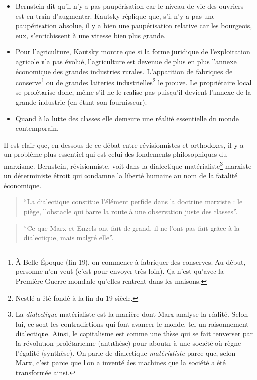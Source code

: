 \documentclass[12pt]{report}
\begin{document}
\begin{itemize}
	\item Bernstein dit qu'il n'y a pas paupérisation car le niveau de vie des ouvriers est en train d'augmenter. Kautsky réplique que, s'il n'y a pas une paupérisation absolue, il y a bien une paupérisation relative car les bourgeois, eux, s'enrichissent à une vitesse bien plus grande.
	\item Pour l’agriculture, Kautsky montre que si la forme juridique de l’exploitation agricole n’a pas évolué, l’agriculture est devenue de plus en plus l’annexe économique des grandes industries rurales. L’apparition de fabriques de conserve\footnote{À Belle Époque (fin 19), on commence à fabriquer des conserves. Au début, personne n'en veut (c'est pour envoyer très loin). Ça n'est qu'avec la Première Guerre mondiale qu'elles rentrent dans les maisons.} ou de grandes laiteries industrielles\footnote{Nestlé a été fondé à la fin du 19 siècle.} le prouve. Le propriétaire local se prolétarise donc, même s’il ne le réalise pas puisqu’il devient l’annexe de la grande industrie (en étant son fournisseur).
	\item Quand à la lutte des classes elle demeure une réalité essentielle du monde contemporain.
\end{itemize}

Il est clair que, en dessous de ce débat entre révisionnistes et orthodoxes, il y a un problème plus essentiel qui est celui des fondements philosophiques du marxisme.
Bernstein, révisionniste, voit dans la dialectique matérialiste\footnote{La \emph{dialectique} matérialiste est la manière dont Marx analyse la réalité. Selon lui, ce sont les contradictions qui font avancer le monde, tel un raisonnement dialectique. Ainsi, le capitalisme est comme une thèse qui se fait renverser par la révolution prolétarienne (antithèse) pour aboutir à une société où règne l'égalité (synthèse). On parle de dialectique \emph{matérialiste} parce que, selon Marx, c'est parce que l'on a inventé des machines que la société a été transformée ainsi.} marxiste un déterministe étroit qui condamne la liberté humaine au nom de la fatalité économique.

\begin{quote}
	\enquote{La dialectique constitue l'élément perfide dans la doctrine marxiste : le piège, l'obstacle qui barre la route à une observation juste des classes}. 
\end{quote}
\begin{quote}
	\enquote{Ce que Marx et Engels ont fait de grand, il ne l'ont pas fait grâce à la dialectique, mais malgré elle}.
\end{quote}
\end{document}
